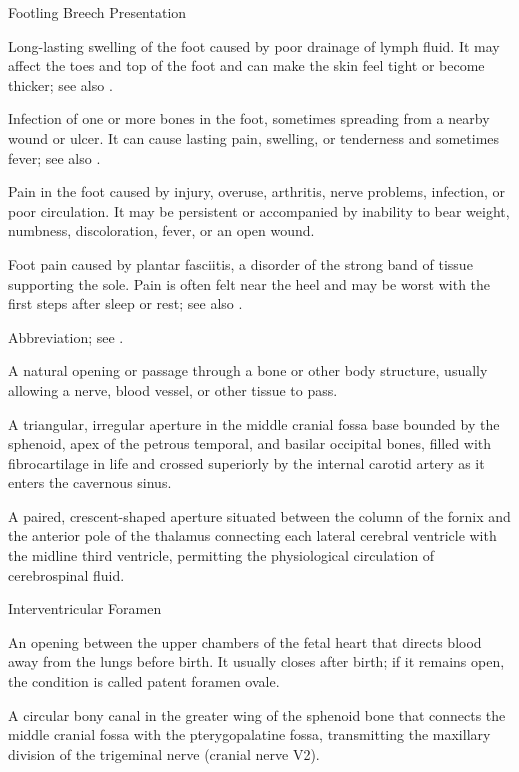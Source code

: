 \synonyms
Footling Breech Presentation

 Long-lasting swelling of the foot caused by poor drainage of lymph fluid. It may affect the toes and top of the foot and can make the skin feel tight or become thicker; see also .

 Infection of one or more bones in the foot, sometimes spreading from a nearby wound or ulcer. It can cause lasting pain, swelling, or tenderness and sometimes fever; see also .

 Pain in the foot caused by injury, overuse, arthritis, nerve problems, infection, or poor circulation. It may be persistent or accompanied by inability to bear weight, numbness, discoloration, fever, or an open wound.

 Foot pain caused by plantar fasciitis, a disorder of the strong band of tissue supporting the sole. Pain is often felt near the heel and may be worst with the first steps after sleep or rest; see also .

 Abbreviation; see .

 A natural opening or passage through a bone or other body structure, usually allowing a nerve, blood vessel, or other tissue to pass.

 A triangular, irregular aperture in the middle cranial fossa base bounded by the sphenoid, apex of the petrous temporal, and basilar occipital bones, filled with fibrocartilage in life and crossed superiorly by the internal carotid artery as it enters the cavernous sinus.

 A paired, crescent-shaped aperture situated between the column of the fornix and the anterior pole of the thalamus connecting each lateral cerebral ventricle with the midline third ventricle, permitting the physiological circulation of cerebrospinal fluid.

\synonyms
Interventricular Foramen

 An opening between the upper chambers of the fetal heart that directs blood away from the lungs before birth. It usually closes after birth; if it remains open, the condition is called patent foramen ovale.

 A circular bony canal in the greater wing of the sphenoid bone that connects the middle cranial fossa with the pterygopalatine fossa, transmitting the maxillary division of the trigeminal nerve (cranial nerve V2).

